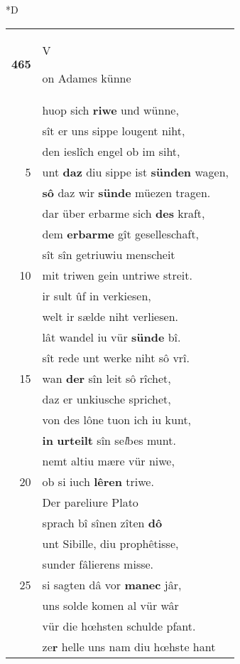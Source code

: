 \documentclass[8pt,a4paper,notitlepage]{article}
\begin{document}
\begin{table}[ht]
\begin{minipage}[t]{0.5\linewidth}
\small
\begin{center}*D
\end{center}
\begin{tabular}{rl}
\textbf{465} & \begin{large}V\end{large}on Adames künne\\ 
 & huop sich \textbf{riwe} und wünne,\\ 
 & sît er uns sippe lougent niht,\\ 
 & den ieslîch engel ob im siht,\\ 
5 & unt \textbf{daz} diu sippe ist \textbf{sünden} wagen,\\ 
 & \textbf{sô} daz wir \textbf{sünde} müezen tragen.\\ 
 & dar über erbarme sich \textbf{des} kraft,\\ 
 & dem \textbf{erbarme} gît geselleschaft,\\ 
 & sît sîn getriuwiu menscheit\\ 
10 & mit triwen gein untriwe streit.\\ 
 & ir sult ûf in verkiesen,\\ 
 & welt ir sælde niht verliesen.\\ 
 & lât wandel iu vür \textbf{sünde} bî.\\ 
 & sît rede unt werke niht sô vrî.\\ 
15 & wan \textbf{der} sîn leit sô rîchet,\\ 
 & daz er unkiusche sprichet,\\ 
 & von des lône tuon ich iu kunt,\\ 
 & \textbf{in} \textbf{urteilt} sîn se\textit{l}bes munt.\\ 
 & nemt altiu mære vür niwe,\\ 
20 & ob si iuch \textbf{lêren} triwe.\\ 
 & Der pareliure Plato\\ 
 & sprach bî sînen zîten \textbf{dô}\\ 
 & unt Sibille, diu prophêtisse,\\ 
 & sunder fâlierens misse.\\ 
25 & si sagten dâ vor \textbf{manec} jâr,\\ 
 & uns solde komen al vür wâr\\ 
 & vür die hœhsten schulde pfant.\\ 
 & ze\textbf{r} helle uns nam diu hœhste hant\\ 

\end{tabular}
\end{minipage}
\end{table}
\end{document}
